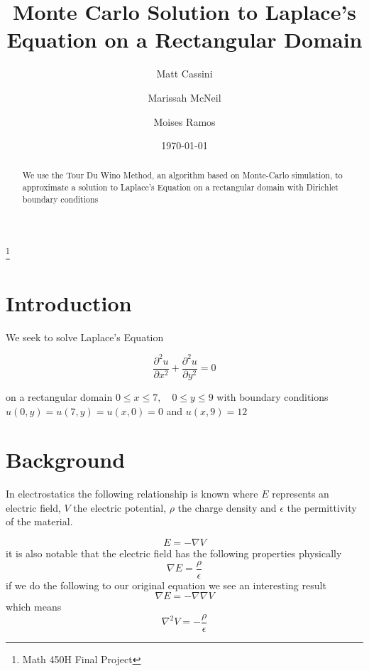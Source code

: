 \documentclass{amsart}
\begin{document}
	
\title{Monte Carlo Solution to Laplace's Equation on a Rectangular Domain}

\author{Matt Cassini}
\address{Department of Mathematical Sciences, New Jersey Institute of Technology, University Heights, Newark, NJ 07102}

\author{Marissah McNeil}
\address{Department of Mathematical Sciences, New Jersey Institute of Technology, University Heights, Newark, NJ 07102}

\author{Moises Ramos}
\address{Department of Mathematical Sciences, New Jersey Institute of Technology, University Heights, Newark, NJ 07102}

\thanks{Math 450H Final Project}
\begin{abstract}
	We use the Tour Du Wino Method, an algorithm based on Monte-Carlo simulation, to approximate a solution to Laplace's Equation on a rectangular domain with Dirichlet boundary conditions
\end{abstract}

\date{\today}
\maketitle



\section{Introduction}
We seek to solve Laplace's Equation

\begin{equation}
	\frac{\partial^2 u}{\partial x^2} + \frac{\partial^2 u}{\partial y^2} = 0
\end{equation}

on a rectangular domain $0 \leq x \leq 7, \quad 0 \leq y \leq 9$ with boundary conditions $u(0,y) = u(7,y) = u(x,0) = 0$ and $u(x,9) = 12$
\section{Background}

In electrostatics the following relationship is known where $E$ represents an electric field, $V$  the electric potential, $\rho$ the charge density and $\epsilon$ the permittivity of the material.

$$E=-\nabla V$$ it is also notable that the electric field has the following properties physically $$\nabla E= \frac{\rho}{\epsilon}$$ if we do the following to our original equation we see an interesting result $$\nabla E=- \nabla \nabla V$$ 
which means $$\nabla ^2 V=- \frac{\rho}{\epsilon}$$ 
\end{document}
